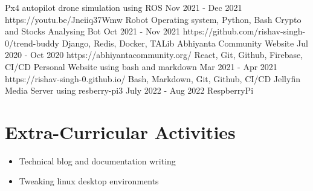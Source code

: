 \documentclass[%
               doublesided,
               paper=a4,
               fontsize=10pt
              ]{my-resume}
\begin{document}
{     \project
        {Px4 autopilot drone simulation using ROS}
        {Nov 2021 - Dec 2021}
        {https://youtu.be/Jneiiq37Wmw}
        {Robot Operating system, Python, Bash}
        {
        }
     \project
        {Crypto and Stocks Analysing Bot}
        {Oct 2021 - Nov 2021}
        {https://github.com/rishav-singh-0/trend-buddy}
        {Django, Redis, Docker, TALib}
        {
        }
     \project
        {Abhiyanta Community Website}
        {Jul 2020 - Oct 2020}
        {https://abhiyantacommunity.org/}
        {React, Git, Github, Firebase, CI/CD}
        {
        }
     \project
        {Personal Website using bash and markdown}
        {Mar 2021 - Apr 2021}
        {https://rishav-singh-0.github.io/}
        {Bash, Markdown, Git, Github, CI/CD}
        {
        }
     \project
        {Jellyfin Media Server using resberry-pi3}
        {July 2022 - Aug 2022}
        {}
        {RespberryPi}
        {}
    
    \section[\faPencil]{Extra-Curricular Activities}
     \begin{itemize}
         \item Technical blog and documentation writing
         \item Tweaking linux desktop environments
     \end{itemize}
    
}
\makebody
\clearpage
\end{document}

